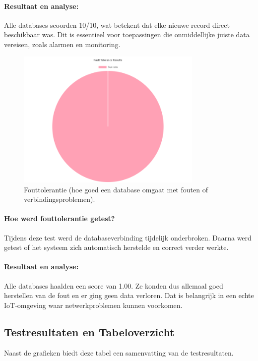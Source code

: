 \paragraph{Resultaat en analyse:}
Alle databases scoorden 10/10, wat betekent dat elke nieuwe record direct beschikbaar was. Dit is essentieel voor toepassingen die onmiddellijke juiste data vereisen, zoals alarmen en monitoring.

\begin{figure}[H]
    \centering
    \includegraphics[width=0.8\textwidth]{Fault_Tolerance.png}
    \caption{Fouttolerantie (hoe goed een database omgaat met fouten of verbindingsproblemen).}
    \label{fig:fault-tolerance-comparison}
\end{figure}

\paragraph{Hoe werd fouttolerantie getest?}
Tijdens deze test werd de databaseverbinding tijdelijk onderbroken. Daarna werd getest of het systeem zich automatisch herstelde en correct verder werkte.

\paragraph{Resultaat en analyse:}
Alle databases haalden een score van 1.00. Ze konden dus allemaal goed herstellen van de fout en er ging geen data verloren. Dat is belangrijk in een echte IoT-omgeving waar netwerkproblemen kunnen voorkomen.

\subsection{Testresultaten en Tabeloverzicht}
Naast de grafieken biedt deze tabel een samenvatting van de testresultaten.

